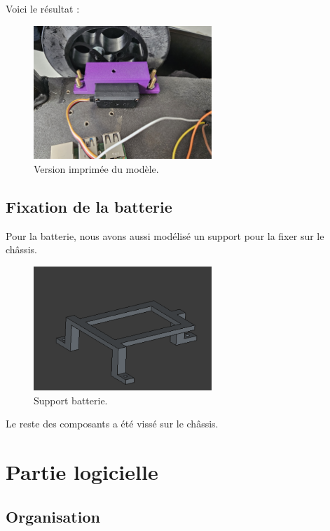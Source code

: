 \documentclass[a4paper,12pt]{report}  %
\begin{document}
Voici le résultat : 

\begin{figure}[H]
	\centering
	\includegraphics[width=0.6\textwidth]{./attachments/servomoteur-roues_impression.jpg}
	\caption{Version imprimée du modèle.}
\end{figure}

\subsection{Fixation de la batterie}
Pour la batterie, nous avons aussi modélisé un support pour la fixer sur le châssis.

\begin{figure}[H]
	\centering
	\includegraphics[width=0.6\textwidth]{./attachments/support_batterie_impression.png}
	\caption{Support batterie.}
\end{figure}

Le reste des composants a été vissé sur le châssis.

\pagebreak
\section{Partie logicielle}
\subsection{Organisation}
\end{document}
